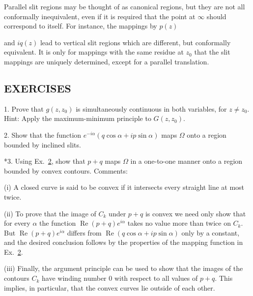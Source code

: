 Parallel slit regions may be thought of as canonical regions, but they are not all conformally inequivalent, even if it is required that the point at $\infty$ should correspond to itself. For instance, the mappings by $p(z)$


and $iq(z)$ lead to vertical slit regions which are different, but conformally equivalent. It is only for mappings with the same residue at $z_{0}$ that the slit mappings are uniquely determined, except for a parallel translation.

\subsection*{EXERCISES}
1. Prove that $g(z,z_{0})$ is simultaneously continuous in both variables, for $z \neq z_{0}$. Hint: Apply the maximum-minimum principle to $G(z,z_{0})$.

2. Show that the function $e^{-i\alpha}(q \cos \alpha + ip \sin \alpha)$ maps $\Omega$ onto a region bounded by inclined slits.

*3. Using Ex.~\hyperref[exercise:6.5.3.8.2]{2}, show that $p + q$ maps $\Omega$ in a one-to-one manner onto a region bounded by convex contours. Comments:

(i) A closed curve is said to be convex if it intersects every straight line at most twice.

(ii) To prove that the image of $C_{k}$ under $p + q$ is convex we need only show that for every $\alpha$ the function $\operatorname{Re}(p + q)e^{i\alpha}$ takes no value more than twice on $C_{k}$. But $\operatorname{Re}(p + q)e^{i\alpha}$ differs from $\operatorname{Re}(q\cos\alpha + ip\sin\alpha)$ only by a constant, and the desired conclusion follows by the properties of the mapping function in Ex.~\hyperref[exercise:6.5.3.8.2]{2}.

(iii) Finally, the argument principle can be used to show that the images of the contours $C_{k}$ have winding number 0 with respect to all values of $p + q$. This implies, in particular, that the convex curves lie outside of each other.


